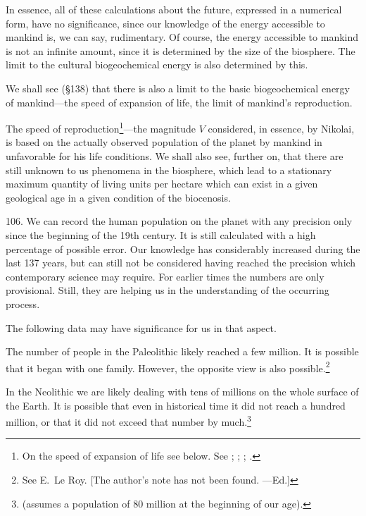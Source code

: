 In essence, all of these calculations about the future, expressed in a
numerical form, have no significance, since our knowledge of the energy
accessible to mankind is, we can say, rudimentary.  Of course, the energy
accessible to mankind is not an infinite amount, since it is determined by the
size of the biosphere.  The limit to the cultural biogeochemical energy is
also determined by this.

We shall see (§138) that there is also a limit to the basic biogeochemical
energy of mankind---the speed of expansion of life, the limit of mankind's
reproduction.

The speed of reproduction\footnote{
	On the speed of expansion of life see below.  See
	\foreignlanguage{french}{\cite{vernadsky1926etudes1}};
	\foreignlanguage{russian}{\cite[413--424, 437--444]{vernadsky1994zhivoe}};
	\foreignlanguage{russian}{\cite[118--125]{vernadsky1940biogeohimicheskie}};
	\foreignlanguage{russian}{\cite[Гл.~20]{vernadsky1965himicheskoe}.}
}---the magnitude $V$ considered, in essence, by Nikolai, is based on the
actually observed population of the planet by mankind in unfavorable for his
life conditions.  We shall also see, further on, that there are still unknown
to us phenomena in the biosphere, which lead to a stationary maximum quantity
of living units per hectare which can exist in a given geological age in a
given condition of the biocenosis.


106. We can record the human population on the planet with any precision only
since the beginning of the 19th century.  It is still calculated with a high
percentage of possible error.  Our knowledge has considerably increased during
the last 137 years, but can still not be considered having reached the
precision which contemporary science may require.  For earlier times the
numbers are only provisional.  Still, they are helping us in the understanding
of the occurring process.

The following data may have significance for us in that aspect.

The number of people in the Paleolithic likely reached a few million.  It is
possible that it began with one family.  However, the opposite view is also
possible.\footnote{See E.~Le Roy. [The author's note has not been found.
---Ed.]}

In the Neolithic we are likely dealing with tens of millions on the whole
surface of the Earth.  It is possible that even in historical time it did not
reach a hundred million, or that it did not exceed that number by
much.\footnote{
	\cite{weinberg1922dvuhdesyatitysyachiletiyu-p21} (assumes a
	population of 80 million at the beginning of our age).}


